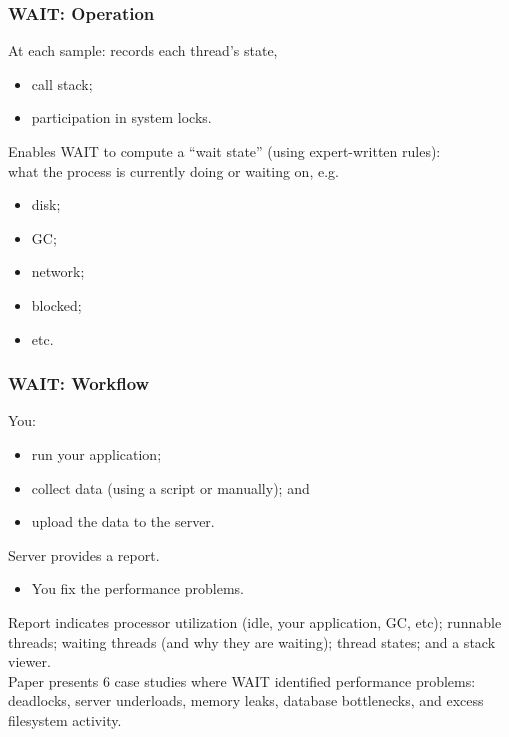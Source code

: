
\begin{frame}
  \frametitle{WAIT: Operation}


  At each sample: records each thread's state,
\begin{itemize}
\item call stack;
\item participation in system locks.
\end{itemize}

  Enables WAIT to compute a ``wait state'' (using expert-written rules): \\
what the process is currently doing or waiting on, e.g.
\begin{itemize}
\item disk;
\item GC;
\item network; 
\item blocked; 
\item etc.
\end{itemize}


\end{frame}


\begin{frame}
  \frametitle{WAIT: Workflow}


You:
\begin{itemize}
\item run your application;
\item collect data (using a script or manually); and 
\item upload the data to the server.
\end{itemize}
Server provides
a report.\\
\begin{itemize}
\item You fix the performance problems.\\[1em]
\end{itemize}

Report indicates processor utilization (idle, your application, GC, 
etc); runnable threads; waiting threads (and why they are waiting); 
thread states; and a stack viewer.\\[1em]

Paper presents 6 case studies where WAIT identified performance
problems: deadlocks, server underloads, memory leaks, database
bottlenecks, and excess filesystem activity.


\end{frame}


